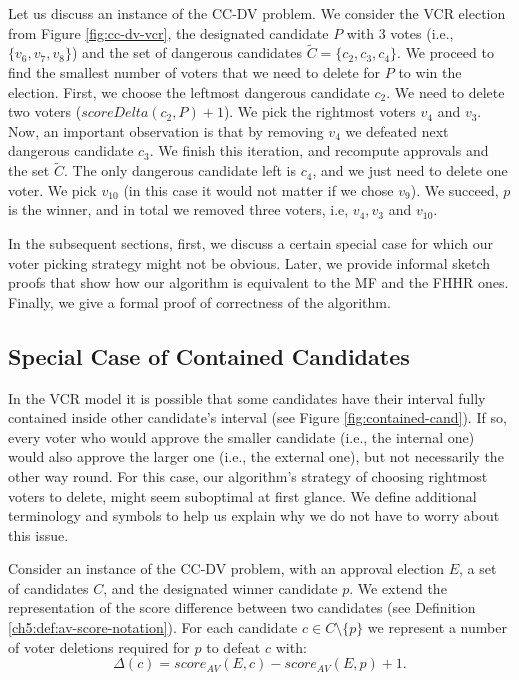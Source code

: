 \begin{example}\label{ex:cc-dv-vcr}
    Let us discuss an instance of the CC-DV problem. We consider the VCR election from Figure \ref{fig:cc-dv-vcr},
    the designated candidate $P$ with 3 votes (i.e., $\{v_6, v_7, v_8\}$) and
    the set of dangerous candidates $\widetilde{C} = \{c_2, c_3, c_4\}$.
    We proceed to find the smallest number of voters that we need to delete for $P$ to win the election.
    First, we choose the leftmost dangerous candidate $c_2$.
    We need to delete two voters ($scoreDelta(c_2,P) + 1$). 
    We pick the rightmost voters $v_4$ and $v_3$.
    Now, an important observation is that by removing $v_4$ we defeated next dangerous candidate $c_3$.
    We finish this iteration, and recompute approvals and the set $\widetilde{C}$.
    The only dangerous candidate left is $c_4$, and we just need to delete one voter.
    We pick $v_{10}$ (in this case it would not matter if we chose $v_9$).
    We succeed, $p$ is the winner, and in total we removed three voters, i.e, $v_4, v_3$ and $v_{10}$.
\end{example}

In the subsequent sections, first, we discuss a certain special case for which our voter picking strategy might not be obvious.
Later, we provide informal sketch proofs that show how our algorithm is equivalent to the MF and the FHHR ones.
Finally, we give a formal proof of correctness of the algorithm.

\subsection{Special Case of Contained Candidates}\label{ch5:sec21:contained:cand}

In the VCR model it is possible that some candidates have their interval fully contained inside other candidate's interval (see Figure \ref{fig:contained-cand}). 
If so, every voter who would approve the smaller candidate (i.e., the internal one) would also approve the larger one (i.e., the external one),
but not necessarily the other way round. For this case, our algorithm's strategy of choosing rightmost voters to delete, might seem suboptimal at first glance. 
We define additional terminology and symbols to help us explain why we do not have to worry about this issue.

\begin{definition}\label{ch5:def:delta-notation}
    Consider an instance of the CC-DV problem, with an approval election $E$, a set of candidates $C$, and the designated winner candidate $p$.
    We extend the representation of the score difference between two candidates (see Definition \ref{ch5:def:av-score-notation}).
    For each candidate $c \in C \setminus \{p\}$ we represent a number of voter deletions required for $p$ to defeat $c$ with:
    \[\Delta(c) = score_{AV}(E,c) - score_{AV}(E,p) + 1.\]
\end{definition}

